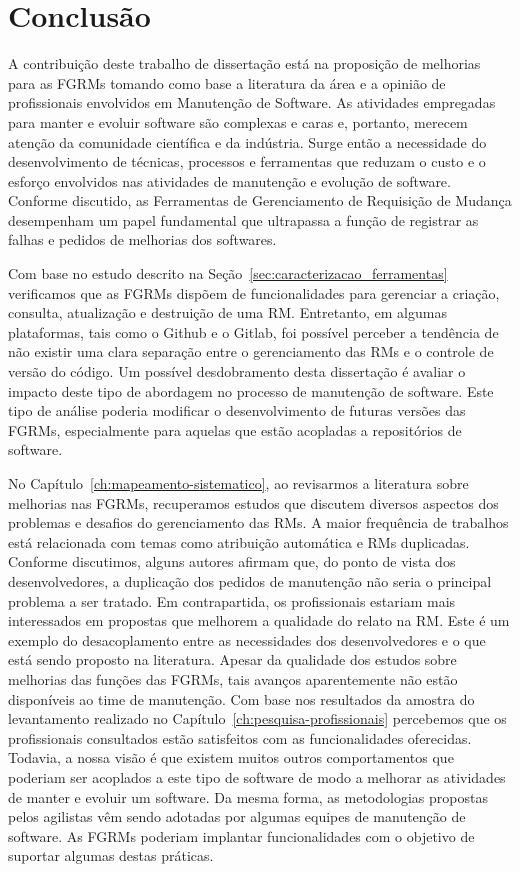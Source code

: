 \chapter{Conclusão}
\label{ch:conclusao_trab_futuros}

A contribuição deste trabalho de dissertação está na proposição de melhorias
para as FGRMs tomando como base a literatura da área e a opinião de
profissionais envolvidos em Manutenção de Software. As atividades empregadas
para manter e evoluir software são complexas e caras e, portanto, merecem
atenção da comunidade científica e da indústria. Surge então a necessidade do
desenvolvimento de técnicas, processos e ferramentas que reduzam o custo e o
esforço envolvidos nas atividades de manutenção e evolução de software. Conforme
discutido, as Ferramentas de Gerenciamento de Requisição de Mudança desempenham
um papel fundamental que ultrapassa a função de registrar as falhas e pedidos de
melhorias dos softwares.

Com base no estudo descrito na Seção~\ref{sec:caracterizacao_ferramentas}
verificamos que as FGRMs dispõem de funcionalidades para gerenciar a criação,
consulta, atualização e destruição de uma RM\@. Entretanto, em algumas
plataformas, tais como o Github e o Gitlab, foi possível perceber a tendência
de não existir uma clara separação entre o gerenciamento das RMs e o controle
de versão do código. Um possível desdobramento desta dissertação é avaliar o
impacto deste tipo de abordagem no processo de manutenção de software. Este
tipo de análise poderia modificar o desenvolvimento de futuras versões das
FGRMs, especialmente para aquelas que estão acopladas a repositórios de
software.

No Capítulo~\ref{ch:mapeamento-sistematico}, ao revisarmos a literatura sobre
melhorias nas FGRMs, recuperamos estudos que discutem diversos aspectos dos
problemas e desafios do gerenciamento das RMs. A maior frequência de trabalhos
está relacionada com temas como atribuição automática e RMs duplicadas.
Conforme discutimos, alguns autores afirmam que, do ponto de vista dos
desenvolvedores, a duplicação dos pedidos de manutenção não seria o principal
problema a ser tratado. Em contrapartida, os profissionais estariam mais
interessados em propostas que melhorem a qualidade do relato na RM\@. Este é um
exemplo do desacoplamento entre as necessidades dos desenvolvedores e o que
está sendo proposto na literatura. Apesar da qualidade dos estudos sobre
melhorias das funções das FGRMs, tais avanços aparentemente não estão
disponíveis ao time de manutenção. Com base nos resultados da amostra do
levantamento realizado no Capítulo~\ref{ch:pesquisa-profissionais} percebemos
que os profissionais consultados estão satisfeitos com as funcionalidades
oferecidas. Todavia, a nossa visão é que existem muitos outros comportamentos
que poderiam ser acoplados a este tipo de software de modo a melhorar as
atividades de manter e evoluir um software. Da mesma forma, as metodologias
propostas pelos agilistas vêm sendo adotadas por algumas equipes de manutenção
de software. As FGRMs poderiam implantar funcionalidades com o objetivo de
suportar algumas destas práticas.

